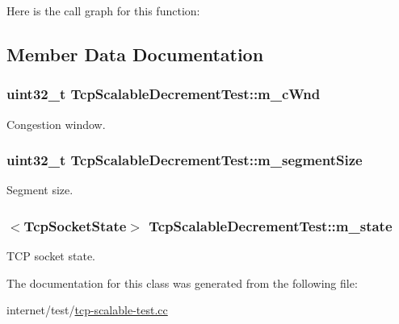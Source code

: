 Here is the call graph for this function\+:




\subsection{Member Data Documentation}
\subsubsection[{\texorpdfstring{m\+\_\+c\+Wnd}{m_cWnd}}]{\setlength{\rightskip}{0pt plus 5cm}uint32\+\_\+t Tcp\+Scalable\+Decrement\+Test\+::m\+\_\+c\+Wnd\hspace{0.3cm}{\ttfamily [private]}}\hypertarget{classTcpScalableDecrementTest_aa18d287ac42c4ab0621a19eaf5bc6a5d}{}\label{classTcpScalableDecrementTest_aa18d287ac42c4ab0621a19eaf5bc6a5d}


Congestion window. 

\subsubsection[{\texorpdfstring{m\+\_\+segment\+Size}{m_segmentSize}}]{\setlength{\rightskip}{0pt plus 5cm}uint32\+\_\+t Tcp\+Scalable\+Decrement\+Test\+::m\+\_\+segment\+Size\hspace{0.3cm}{\ttfamily [private]}}\hypertarget{classTcpScalableDecrementTest_a12ef20778091715637bbd243248fcf93}{}\label{classTcpScalableDecrementTest_a12ef20778091715637bbd243248fcf93}


Segment size. 

\subsubsection[{\texorpdfstring{m\+\_\+state}{m_state}}]{$<${\bf Tcp\+Socket\+State}$>$ Tcp\+Scalable\+Decrement\+Test\+::m\+\_\+state\hspace{0.3cm}{\ttfamily [private]}}\hypertarget{classTcpScalableDecrementTest_a48e6388606dba30357673eab458bea25}{}\label{classTcpScalableDecrementTest_a48e6388606dba30357673eab458bea25}


T\+CP socket state. 



The documentation for this class was generated from the following file\+:\begin{DoxyCompactItemize}
\item 
internet/test/\hyperlink{tcp-scalable-test_8cc}{tcp-\/scalable-\/test.\+cc}\end{DoxyCompactItemize}
